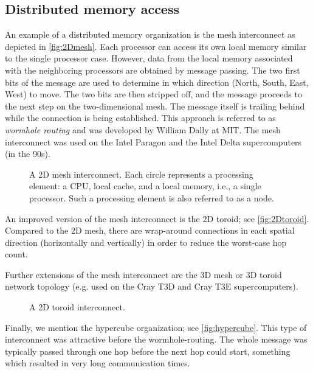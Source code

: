 \subsection{Distributed memory access}

An example of a distributed memory organization is the mesh interconnect as
depicted in \autoref{fig:2Dmesh}. Each processor can access its own local memory
similar to the single processor case. However, data from the local memory
associated with the neighboring processors are obtained by message passing. The
two first bits of the message are used to determine in which direction (North,
South, East, West) to move. The two bits are then stripped off, and the message
proceeds to the next step on the two-dimensional mesh. The message itself is
trailing behind while the connection is being established. This approach is
referred to as \emph{wormhole routing} and was developed by William Dally at
MIT. The mesh interconnect was used on the Intel Paragon and the Intel Delta
supercomputers (in the 90s).

\begin{figure}
  \centering
  
  \caption{
    A 2D mesh interconnect. Each circle represents a processing element: a CPU,
    local cache, and a local memory, i.e., a single processor. Such a processing
    element is also referred to as a node.
  }
  \label{fig:2Dmesh}
\end{figure}

An improved version of the mesh interconnect is the 2D toroid; see
\autoref{fig:2Dtoroid}. Compared to the 2D mesh, there are wrap-around
connections in each spatial direction (horizontally and vertically) in order to
reduce the worst-case hop count.

Further extensions of the mesh interconnect are the 3D mesh or 3D toroid network
topology (e.g. used on the Cray T3D and Cray T3E supercomputers).

\begin{figure}
  \centering
  
  \caption{A 2D toroid interconnect.}
  \label{fig:2Dtoroid}
\end{figure}

Finally, we mention the hypercube organization; see \autoref{fig:hypercube}.
This type of interconnect was attractive before the wormhole-routing. The whole
message was typically passed through one hop before the next hop could start,
something which resulted in very long communication times.

